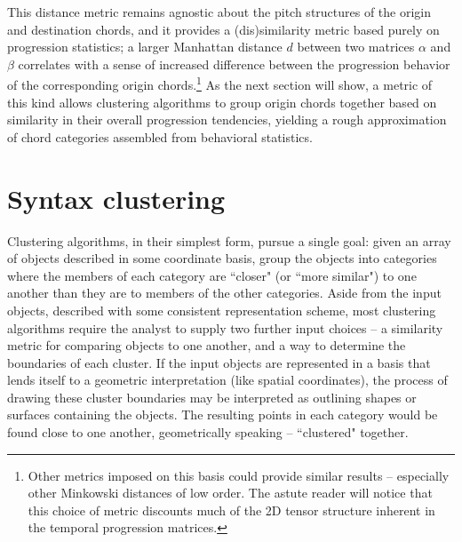 This distance metric remains agnostic about the pitch structures of the origin and destination chords, and it provides a (dis)similarity metric based purely on progression statistics; a larger Manhattan distance $d$ between two matrices $\alpha$ and $\beta$ correlates with a sense of increased difference between the progression behavior of the corresponding origin chords.\footnote{Other metrics imposed on this basis could provide similar results -- especially other Minkowski distances of low order.  The astute reader will notice that this choice of metric discounts much of the 2D tensor structure inherent in the temporal progression matrices.} As the next section will show, a metric of this kind allows clustering algorithms to group origin chords together based on similarity in their overall progression tendencies, yielding a rough approximation of chord categories assembled from behavioral statistics.

\section{Syntax clustering}
Clustering algorithms, in their simplest form, pursue a single goal: given an array of objects described in some coordinate basis, group the objects into categories where the members of each category are ``closer" (or ``more similar") to one another than they are to members of the other categories.  Aside from the input objects, described with some consistent representation scheme, most clustering algorithms require the analyst to supply two further input choices -- a similarity metric for comparing objects to one another, and a way to determine the boundaries of each cluster.  If the input objects are represented in a basis that lends itself to a geometric interpretation (like spatial coordinates), the process of drawing these cluster boundaries may be interpreted as outlining shapes or surfaces containing the objects.  The resulting points in each category would be found close to one another, geometrically speaking -- ``clustered" together.

